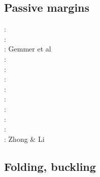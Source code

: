 \subsection{Passive margins} 

\begin{scriptsize}
\nineteeneightytwo: \cite{clwv82}\\
\nineteeneightysix: \cite{lies86}\\
\twothousandfive: Gemmer et al \cite{gebi05}\\
\twothousandeight: \cite{clbz08}\cite{kasb08}\\
\twothousandten: \cite{fasm10}\cite{nigm10}\\
\twothousandeleven: \cite{rapy11}\cite{nigm11}\cite{brfo11}\\
\twothousandthirteen: \cite{mana13}\cite{yahb13}\\
\twothousandfourteen: \cite{macg14}\\
\twothousandfifteen: \cite{gebw15}\cite{nigo15}\\
\twothousandsixteen: \cite{dupm16}\\
\twothousandeighteen: \cite{sahf18}\cite{mube18}\cite{tebu18}\\
\twothousandnineteen: Zhong \& Li \cite{zhli19}
\end{scriptsize}


\subsection{Folding, buckling} 

